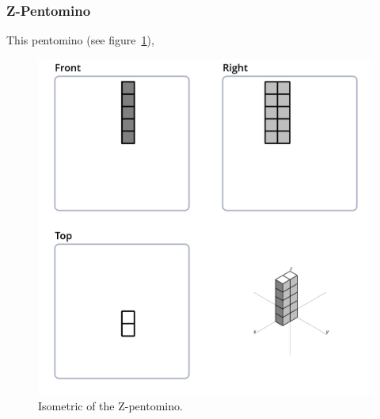 \subsubsection{Z-Pentomino}
\label{sec:z-pentomino}
This pentomino (see figure~\ref{fig:iso-pent-z}),


\begin{figure}
	\centering
	\includegraphics[scale=0.3]{iso_diagrams/o.png}
	\caption{Isometric of the Z-pentomino.}
  \label{fig:iso-pent-z}
\end{figure}
